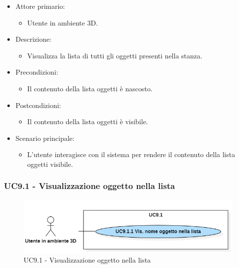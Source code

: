 \begin{itemize}

	\item Attore primario: 
	\begin{itemize}
		\item Utente in ambiente 3D.
	\end{itemize}
	\item Descrizione:
	\begin{itemize}
		\item Visualizza la lista di tutti gli oggetti presenti nella stanza.
	\end{itemize}
	
	\item Precondizioni:
	\begin{itemize}
		\item Il contenuto della lista oggetti è nascosto.
	\end{itemize}
	
	\item Postcondizioni:
	\begin{itemize}
		\item Il contenuto della lista oggetti è visibile.
	\end{itemize}
	
	\item Scenario principale:
	\begin{itemize}
		\item L'utente interagisce con il sistema per rendere il contenuto della lista oggetti visibile.
	\end{itemize}
	
\end{itemize}


\subsubsection{UC9.1 - Visualizzazione oggetto nella lista}

\begin{figure}[H]
  \renewcommand{\thefigure}{12}
  \includegraphics[width=\linewidth]{./res/images/UC9.1.png}
  \caption{UC9.1 - Visualizzazione oggetto nella lista}
  \label{fig:UC 9.1}
\end{figure}

